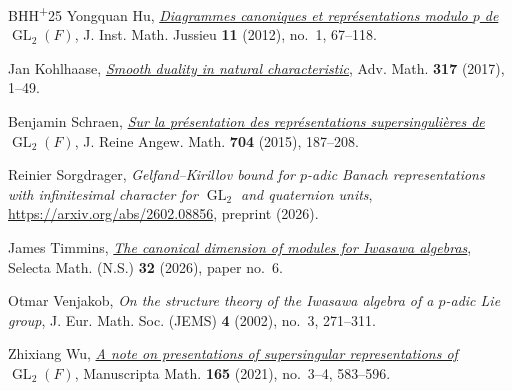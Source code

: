 \documentclass[11pt]{article}
\numberwithin{equation}{section}
\theoremstyle{definition}
\theoremstyle{remark}
\DeclareMathOperator{\GL}{GL}
\begin{document}
\begin{cbunit}
\begin{thebibliography}{BHH\textsuperscript{+}25}
Yongquan Hu,
\href{https://arxiv.org/abs/0904.3991}{\emph{Diagrammes canoniques et
repr\'esentations modulo $p$ de $\GL_2(F)$}},
J. Inst. Math. Jussieu \textbf{11} (2012), no.~1, 67--118.

Jan Kohlhaase,
\href{https://doi.org/10.1016/j.aim.2017.06.038}{\emph{Smooth duality
in natural characteristic}},
Adv. Math. \textbf{317} (2017), 1--49.

Benjamin Schraen,
\href{https://arxiv.org/abs/1201.4255}{\emph{Sur la pr\'esentation des
repr\'esentations supersinguli\`eres de $\GL_2(F)$}},
J. Reine Angew. Math. \textbf{704} (2015), 187--208.

Reinier Sorgdrager,
\emph{Gelfand--Kirillov bound for $p$-adic Banach representations
with infinitesimal character for $\GL_2$ and quaternion units},
\url{https://arxiv.org/abs/2602.08856}, preprint (2026).

James Timmins, \href{https://arxiv.org/abs/2306.09696}{\emph{The canonical dimension of modules for Iwasawa algebras}}, Selecta Math. (N.S.) \textbf{32} (2026), paper no.~6.

Otmar Venjakob, \emph{On the structure theory of the {I}wasawa algebra of a
  {$p$}-adic {L}ie group}, J. Eur. Math. Soc. (JEMS) \textbf{4} (2002), no.~3,
  271--311.  


Zhixiang Wu,
\href{https://arxiv.org/abs/1911.12030}{\emph{A note on presentations
of supersingular representations of $\GL_2(F)$}},
Manuscripta Math. \textbf{165} (2021), no.~3--4, 583--596.

\end{thebibliography}
\end{cbunit}



\end{document}
